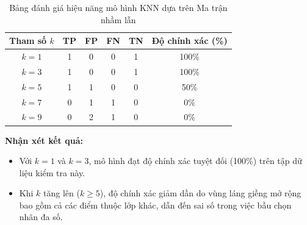 \begin{table}[H]
    \centering
    \begin{tabular}{|c|c|c|c|c|c|}
        \hline
        \textbf{Tham số $k$} & \textbf{TP} & \textbf{FP} & \textbf{FN} & \textbf{TN} & \textbf{Độ chính xác (\%)} \\
        \hline
        $k = 1$ & 1 & 0 & 0 & 1 & 100\% \\ \hline
        $k = 3$ & 1 & 0 & 0 & 1 & 100\% \\ \hline
        $k = 5$ & 1 & 1 & 0 & 0 & 50\% \\ \hline
        $k = 7$ & 0 & 1 & 1 & 0 & 0\% \\ \hline
        $k = 9$ & 0 & 2 & 1 & 0 & 0\% \\ \hline
    \end{tabular}
    \caption{Bảng đánh giá hiệu năng mô hình KNN dựa trên Ma trận nhầm lẫn}
\end{table}

\textbf{Nhận xét kết quả:}
\begin{itemize}
    \item Với $k = 1$ và $k = 3$, mô hình đạt độ chính xác tuyệt đối (100\%) trên tập dữ liệu kiểm tra này.
    \item Khi $k$ tăng lên ($k \ge 5$), độ chính xác giảm dần do vùng láng giềng mở rộng bao gồm cả các điểm thuộc lớp khác, dẫn đến sai số trong việc bầu chọn nhãn đa số.
\end{itemize}